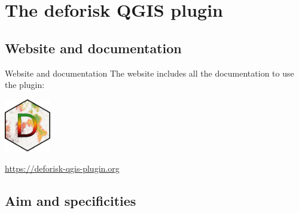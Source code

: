 \documentclass[10pt,table,dvipsnames,compress]{beamer}
\newif\ifplacelogo %
\begin{document}


\section{The deforisk QGIS plugin}
\label{sec:orgf0e5117}

\subsection{Website and documentation}
\label{sec:org625af6b}

\begin{frame}[label={sec:org483833a}]{Website and documentation}
The website includes all the documentation to use the plugin:\\[0pt]

\begin{center}
\includegraphics[width=2cm]{figs/logo-deforisk.png}
\end{center}

\centering \url{https://deforisk-qgis-plugin.org}
\end{frame}

\subsection{Aim and specificities}
\label{sec:orgb161bfa}
\end{document}
